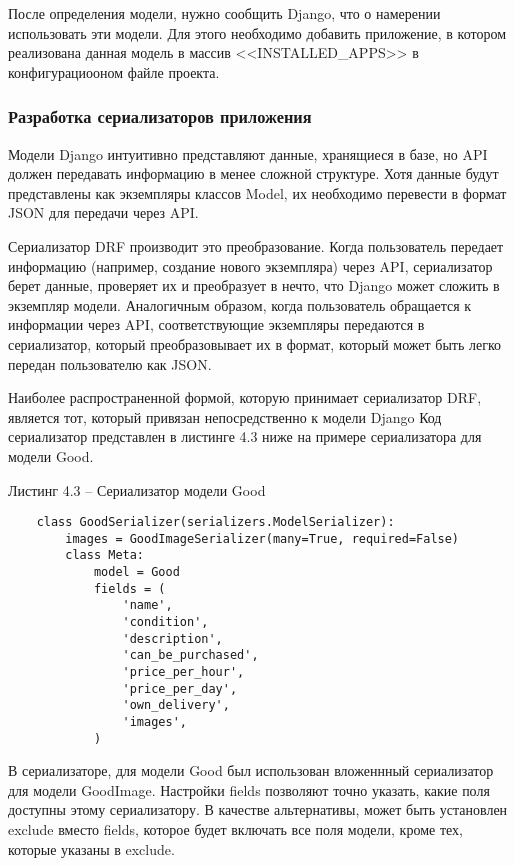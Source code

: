 После определения модели, нужно сообщить Django, что о намерении использовать эти модели.
Для этого необходимо добавить приложение, в котором реализована данная модель в массив <<INSTALLED\_APPS>> в конфигурациооном файле проекта.


\subsubsection{Разработка сериализаторов приложения}\hfill

Модели Django интуитивно представляют данные, хранящиеся в базе, но API должен передавать информацию в менее сложной структуре.
Хотя данные будут представлены как экземпляры классов Model, их необходимо перевести в формат JSON для передачи через API.

Сериализатор DRF производит это преобразование.
Когда пользователь передает информацию (например, создание нового экземпляра) через API, сериализатор берет данные, проверяет их и преобразует в нечто, что Django может сложить в экземпляр модели.
Аналогичным образом, когда пользователь обращается к информации через API, соответствующие экземпляры передаются в сериализатор, который преобразовывает их в формат, который может быть легко передан пользователю как JSON.

Наиболее распространенной формой, которую принимает сериализатор DRF, является тот, который привязан непосредственно к модели Django
Код сериализатор представлен в листинге 4.3 ниже на примере сериализатора для модели Good.

Листинг 4.3 – Сериализатор модели Good
\begin{lstlisting}
    class GoodSerializer(serializers.ModelSerializer):
        images = GoodImageSerializer(many=True, required=False)
        class Meta:
            model = Good
            fields = (
                'name',
                'condition',
                'description',
                'can_be_purchased',
                'price_per_hour',
                'price_per_day',
                'own_delivery',
                'images',
            )
\end{lstlisting}

В сериализаторе, для модели Good был использован вложеннный сериализатор для модели GoodImage.
Настройки fields позволяют точно указать, какие поля доступны этому сериализатору.
В качестве альтернативы, может быть установлен exclude вместо fields, которое будет включать все поля модели, кроме тех, которые указаны в exclude.

